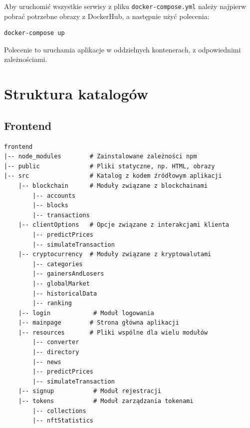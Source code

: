 Aby uruchomić wszystkie serwisy z pliku \texttt{docker-compose.yml} należy najpierw pobrać potrzebne obrazy z DockerHub, a następnie użyć polecenia:
\begin{lstlisting}
docker-compose up
\end{lstlisting}

Polecenie to uruchamia aplikacje w oddzielnych kontenerach, z odpowiednimi zależnościami.

\section{Struktura katalogów}

\subsection{Frontend}
{\footnotesize
\begin{verbatim}
frontend
|-- node_modules        # Zainstalowane zależności npm
|-- public              # Pliki statyczne, np. HTML, obrazy
|-- src                 # Katalog z kodem źródłowym aplikacji
    |-- blockchain      # Moduły związane z blockchainami
        |-- accounts
        |-- blocks
        |-- transactions
    |-- clientOptions   # Opcje związane z interakcjami klienta
        |-- predictPrices
        |-- simulateTransaction
    |-- cryptocurrency  # Moduły związane z kryptowalutami
        |-- categories
        |-- gainersAndLosers
        |-- globalMarket
        |-- historicalData
        |-- ranking
    |-- login            # Moduł logowania
    |-- mainpage        # Strona główna aplikacji
    |-- resources       # Pliki wspólne dla wielu modułów
        |-- converter
        |-- directory
        |-- news
        |-- predictPrices
        |-- simulateTransaction
    |-- signup           # Moduł rejestracji
    |-- tokens           # Moduł zarządzania tokenami
        |-- collections
        |-- nftStatistics
\end{verbatim}
}
